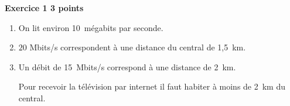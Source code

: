 \textbf{Exercice 1 \hfill 3 points}

\medskip

% 
%

\begin{enumerate}
\item %
On lit environ 10~mégabits par seconde.
\item %
$20$ Mbits/s correspondent à une distance du central de 1,5~km. 
\item %
 
Un débit de 15~Mbits/s correspond à une distance de 2~km.

Pour recevoir la télévision par internet il faut habiter à moins de 2~km du central. 
\end{enumerate}

\bigskip

